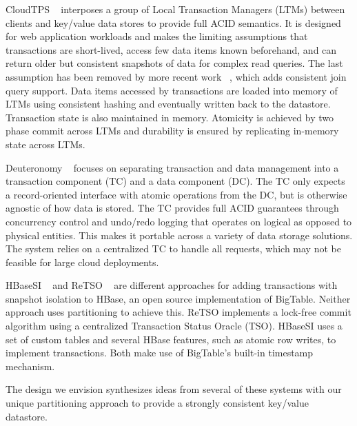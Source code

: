 \documentclass[10pt,final,journal]{IEEEtran}
\begin{document}
CloudTPS ~\cite{Wei:2011:5740834} interposes a group of Local Transaction Managers (LTMs) between clients and key/value data stores to provide full ACID semantics. It is designed for web application workloads and makes the limiting assumptions that transactions are short-lived, access few data items known beforehand, and can return older but consistent snapshots of data for complex read queries. The last assumption has been removed by more recent work ~\cite{Wei:2011:CJQ}, which adds consistent join query support. Data items accessed by transactions are loaded into memory of LTMs using consistent hashing and eventually written back to the datastore. Transaction state is also maintained in memory. Atomicity is achieved by two phase commit across LTMs and durability is ensured by replicating in-memory state across LTMs.

Deuteronomy ~\cite{Levandoski:2011:8530161} focuses on separating transaction and data management into a transaction component (TC) and a data component (DC). The TC only expects a record-oriented interface with atomic operations from the DC, but is otherwise agnostic of how data is stored. The TC provides full ACID guarantees through concurrency control and undo/redo logging that operates on logical as opposed to physical entities. This makes it portable across a variety of data storage solutions. The system relies on a centralized TC to handle all requests, which may not be feasible for large cloud deployments.

HBaseSI ~\cite{Zhang:2010:5697970} and ReTSO ~\cite{Junqueira:2011:LTS:2056318.2057148} are different approaches for adding transactions with snapshot isolation to HBase, an open source implementation of BigTable. Neither approach uses partitioning to achieve this. ReTSO implements a lock-free commit algorithm using a centralized Transaction Status Oracle (TSO). HBaseSI uses a set of custom tables and several HBase features, such as atomic row writes, to implement transactions. Both make use of BigTable's built-in timestamp mechanism.

The design we envision synthesizes ideas from several of these systems with our unique partitioning approach to provide a strongly consistent key/value datastore.
\end{document}
